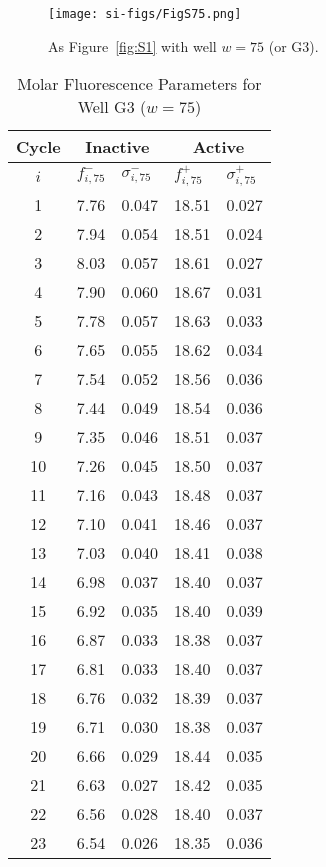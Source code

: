                 \begin{figure}
                    \centering
                    \texttt{[image: si-figs/FigS75.png]}
                    \caption{
                        As Figure~\ref{fig:S1} with well $w=75$ (or G3).
                    }
                \end{figure}
                \clearpage
    \begin{table}
        \caption{Molar Fluorescence Parameters for Well G3 ($w=75$)}
        \centering
        \begin{tabular}{c|ll|ll}
            Cycle & \multicolumn{2}{c|}{Inactive} & \multicolumn{2}{c}{Active} \\
            \hline
            $i$ & $f_{i,75}^{-}$ & $\sigma_{i,75}^{-}$ &  $f_{i,75}^{+}$ & $\sigma_{i,75}^{+}$ \\
            \hline
    1 & 7.76 & 0.047 & 18.51 & 0.027 \\
2 & 7.94 & 0.054 & 18.51 & 0.024 \\
3 & 8.03 & 0.057 & 18.61 & 0.027 \\
4 & 7.90 & 0.060 & 18.67 & 0.031 \\
5 & 7.78 & 0.057 & 18.63 & 0.033 \\
6 & 7.65 & 0.055 & 18.62 & 0.034 \\
7 & 7.54 & 0.052 & 18.56 & 0.036 \\
8 & 7.44 & 0.049 & 18.54 & 0.036 \\
9 & 7.35 & 0.046 & 18.51 & 0.037 \\
10 & 7.26 & 0.045 & 18.50 & 0.037 \\
11 & 7.16 & 0.043 & 18.48 & 0.037 \\
12 & 7.10 & 0.041 & 18.46 & 0.037 \\
13 & 7.03 & 0.040 & 18.41 & 0.038 \\
14 & 6.98 & 0.037 & 18.40 & 0.037 \\
15 & 6.92 & 0.035 & 18.40 & 0.039 \\
16 & 6.87 & 0.033 & 18.38 & 0.037 \\
17 & 6.81 & 0.033 & 18.40 & 0.037 \\
18 & 6.76 & 0.032 & 18.39 & 0.037 \\
19 & 6.71 & 0.030 & 18.38 & 0.037 \\
20 & 6.66 & 0.029 & 18.44 & 0.035 \\
21 & 6.63 & 0.027 & 18.42 & 0.035 \\
22 & 6.56 & 0.028 & 18.40 & 0.037 \\
23 & 6.54 & 0.026 & 18.35 & 0.036 \\

\end{tabular}
\end{table}
